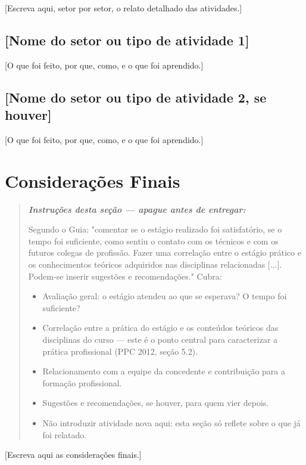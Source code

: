 \documentclass[article,12pt,a4paper]{abntex2}
\newenvironment{instrucoes}{%
  \begin{quotation}\footnotesize\itshape
  \noindent\textbf{\upshape Instruções desta seção — apague antes de entregar:}\par\smallskip
}{%
  \end{quotation}
}
\begin{document}
[Escreva aqui, setor por setor, o relato detalhado das atividades.]

\subsection{[Nome do setor ou tipo de atividade 1]}

[O que foi feito, por que, como, e o que foi aprendido.]

\subsection{[Nome do setor ou tipo de atividade 2, se houver]}

[O que foi feito, por que, como, e o que foi aprendido.]

\section{Considerações Finais}

\begin{instrucoes}
Segundo o Guia: "comentar se o estágio realizado foi satisfatório, se o tempo foi suficiente, como sentiu o contato com os técnicos e com os futuros colegas de profissão. Fazer uma correlação entre o estágio prático e os conhecimentos teóricos adquiridos nas disciplinas relacionadas [...]. Podem-se inserir sugestões e recomendações." Cubra:
\begin{itemize}
  \item Avaliação geral: o estágio atendeu ao que se esperava? O tempo foi suficiente?
  \item Correlação entre a prática do estágio e os conteúdos teóricos das disciplinas do curso — este é o ponto central para caracterizar a prática profissional (PPC 2012, seção 5.2).
  \item Relacionamento com a equipe da concedente e contribuição para a formação profissional.
  \item Sugestões e recomendações, se houver, para quem vier depois.
  \item Não introduzir atividade nova aqui: esta seção só reflete sobre o que já foi relatado.
\end{itemize}
\end{instrucoes}

[Escreva aqui as considerações finais.]

\postextual
\end{document}
